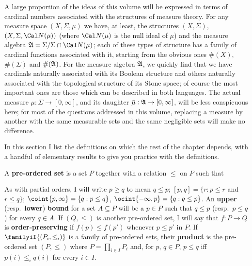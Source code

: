 
\def\nw{\mathop{\text{nw}}}
\def\triplepc#1#2#3{(#1,#2,\hbox{$<$}#3)}
\def\bu{\mathop{\text{bu}}}

\def\chaptername{Cardinal functions}
\def\sectionname{Definitions}


A large proportion of the ideas of this volume will be expressed in
terms of cardinal numbers associated with the structures of measure
theory.   For any measure space $(X,\Sigma,\mu)$ we have, at least, the
structures $(X,\Sigma)$, $(X,\Sigma,\Cal N(\mu))$ (where $\Cal N(\mu)$
is the null ideal of $\mu$) and the measure algebra
$\frak A=\Sigma/\Sigma\cap\Cal N(\mu)$;  each of these types of
structure has
a family of cardinal functions associated with it, starting from the
obvious ones $\#(X)$, $\#(\Sigma)$ and $\#(\frak A)$.   For the measure
algebra $\frak A$, we quickly find that we have cardinals naturally
associated with its Boolean structure and others naturally associated
with the topological structure of its Stone space;  of course the most
important ones are those which can be described in both languages.   The
actual measure $\mu:\Sigma\to[0,\infty]$, and its daughter
$\bar\mu:\frak A\to[0,\infty]$, will be less conspicuous here;   for most
of the questions addressed in this volume, replacing a measure by
another with the same measurable sets and the same negligible sets will
make no difference.

In this section I list the definitions on which the rest of the chapter
depends, with a handful of elementary results to give you practice with
the definitions.

   A {\bf pre-ordered
set} is a set $P$ together with a relation $\le$ on $P$ such that


\noindent{}As with partial orders,
I will write $p\ge q$ to mean $q\le p$;
$[p,q]=\{r:p\le r$ and $r\le q\}$;  $\coint{p,\infty}=\{q:p\le q\}$,
$\ocint{-\infty,p}=\{q:q\le p\}$.   An {\bf upper} (resp.\ {\bf lower})
{\bf bound} for a set $A\subseteq P$ will be a $p\in P$ such that $q\le p$
(resp.\ $p\le q$) for every $q\in A$.   If $(Q,\le)$ is another pre-ordered
set, I will say that $f:P\to Q$ is {\bf order-preserving} if
$f(p)\le f(p')$ whenever $p\le p'$ in $P$.   If $\familyiI{(P_i,\le_i)}$ is
a family of pre-ordered sets, their {\bf product} is the pre-ordered set
$(P,\le)$ where $P=\prod_{i\in I}P_i$ and, for $p$, $q\in P$,
$p\le q$ iff $p(i)\le_iq(i)$ for every $i\in I$.

